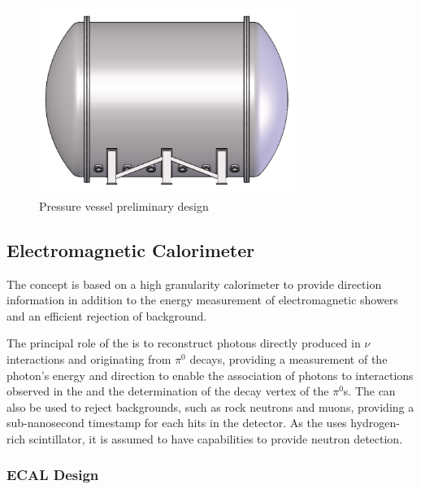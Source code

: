 \begin{figure}[ht]
\centering 
\includegraphics[width=0.75\textwidth]{graphics/tpc_pressurevessel.png} 
\caption{Pressure vessel preliminary design} 
\label{fig:TPC_PV} 
\end{figure}

\subsection{Electromagnetic Calorimeter}
The   concept is based on a high granularity calorimeter to provide direction information in addition to the energy measurement of electromagnetic showers and an efficient rejection of background.

The principal role of the  is to reconstruct photons directly produced in $\nu$ interactions and originating from $\pi^0$ decays, providing a measurement of the photon's energy and direction to enable the association of photons to interactions observed in the  and the determination of the decay vertex of the $\pi^0$s. The  can also be used to reject backgrounds, such as rock neutrons and muons, providing a sub-nanosecond timestamp \cite{Simon:2013zya} for each hits in the detector. As the  uses hydrogen-rich scintillator, it is assumed to have capabilities to provide neutron detection.

\subsubsection{ECAL Design}

